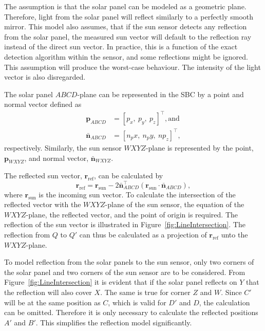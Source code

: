 The assumption is that the solar panel can be modeled as a geometric plane. Therefore, light from the solar panel will reflect similarly to a perfectly smooth mirror. This model also assumes, that if the sun sensor detects any reflection from the solar panel, the measured sun vector will default to the reflection ray instead of the direct sun vector. In practice, this is a function of the exact detection algorithm within the sensor, and some reflections might be ignored.  This assumption will produce the worst-case behaviour.  The intensity of the light vector is also disregarded.

The solar panel $ABCD$-plane can be represented in the SBC by a point and normal vector defined as
\begin{equation}
\begin{split}
\mathbf{p}_{ABCD} &= [p_x,~p_y,~p_z]^\top, \text{and}\\
\bar{\mathbf{n}}_{ABCD} &= [n_px,~n_py,~np_z]^\top,
\end{split}
\end{equation}
respectively.  Similarly, the sun sensor $WXYZ$-plane is represented by the point, $\mathbf{p}_{WXYZ}$, and normal vector, $\bar{\mathbf{n}}_{WXYZ}$.

The reflected sun vector, $\mathbf{r}_{\text{ref}}$, can be calculated by
\begin{equation}
\mathbf{r}_{\text{ref}} = \mathbf{r}_{\text{sun}} - 2\bar{\mathbf{n}}_{ABCD}^\top(\mathbf{r}_{\text{sun}} \cdot \bar{\mathbf{n}}_{ABCD}),
\end{equation}
where $\mathbf{r}_{\text{sun}}$ is the incoming sun vector.  To calculate the intersection of the reflected vector with the $WXYZ$-plane of the sun sensor, the equation of the $WXYZ$-plane, the reflected vector, and the point of origin is required. The reflection of the sun vector is illustrated in Figure~\ref{fig:LineIntersection}. The reflection from $Q$ to $Q'$ can thus be calculated as a projection of $\mathbf{r}_{\text{ref}}$ unto the $WXYZ$-plane.

To model reflection from the solar panels to the sun sensor, only two corners of the solar panel and two corners of the sun sensor are to be considered. From Figure~\ref{fig:LineIntersection} it is evident that if the solar panel reflects on $Y$ that the reflection will also cover $X$. The same is true for corner $Z$ and $W$. Since $C'$ will be at the same position as $C$, which is valid for $D'$ and $D$, the calculation can be omitted. Therefore it is only necessary to calculate the reflected positions $A'$ and $B'$. This simplifies the reflection model significantly.

